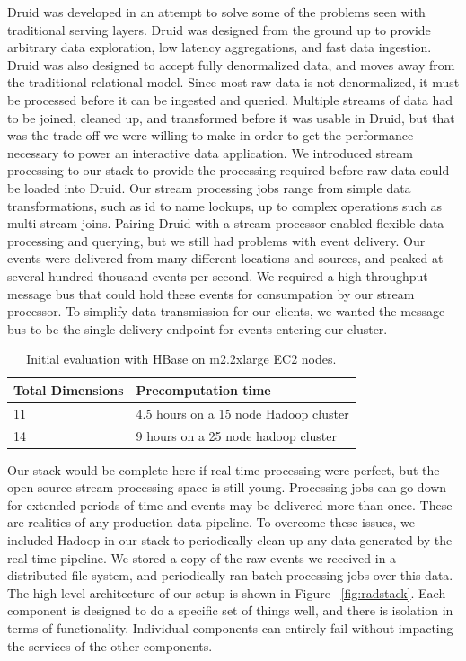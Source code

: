 \documentclass{vldb}
\begin{document}
Druid was developed in an attempt to solve some of the problems seen with
traditional serving layers. Druid was designed from the ground up to provide
arbitrary data exploration, low latency aggregations, and fast data ingestion.
Druid was also designed to accept fully denormalized data, and moves away from
the traditional relational model. Since most raw data is not denormalized, it
must be processed before it can be ingested and queried. Multiple streams of
data had to be joined, cleaned up, and transformed before it was usable in
Druid, but that was the trade-off we were willing to make in order to get the
performance necessary to power an interactive data application. We introduced
stream processing to our stack to provide the processing required before raw
data could be loaded into Druid. Our stream processing jobs range from simple
data transformations, such as id to name lookups, up to complex operations such
as multi-stream joins.  Pairing Druid with a stream processor enabled flexible
data processing and querying, but we still had problems with event delivery.
Our events were delivered from many different locations and sources, and peaked
at several hundred thousand events per second. We required a high throughput
message bus that could hold these events for consumpation by our stream
processor.  To simplify data transmission for our clients, we wanted the
message bus to be the single delivery endpoint for events entering our cluster.  

\begin{table}
\centering
\scriptsize\begin{tabular}{| l | l |} \hline
\textbf{Total Dimensions} & \textbf{Precomputation time} \\ \hline
  11 & 4.5 hours on a 15 node Hadoop cluster \\ \hline
  14 & 9 hours on a 25 node hadoop cluster \\ \hline
\end{tabular}
\normalsize
\caption{Initial evaluation with HBase on m2.2xlarge EC2 nodes.}
\label{tab:hbase_results}
\end{table}

Our stack would be complete here if real-time processing were perfect, but the
open source stream processing space is still young. Processing jobs can go down
for extended periods of time and events may be delivered more than once.  These
are realities of any production data pipeline. To overcome these issues, we
included Hadoop in our stack to periodically clean up any data generated by the
real-time pipeline. We stored a copy of the raw events we received in a
distributed file system, and periodically ran batch processing jobs over this
data. The high level architecture of our setup is shown in Figure
~\ref{fig:radstack}. Each component is designed to do a specific set of things
well, and there is isolation in terms of functionality. Individual components
can entirely fail without impacting the services of the other components.
\end{document}
